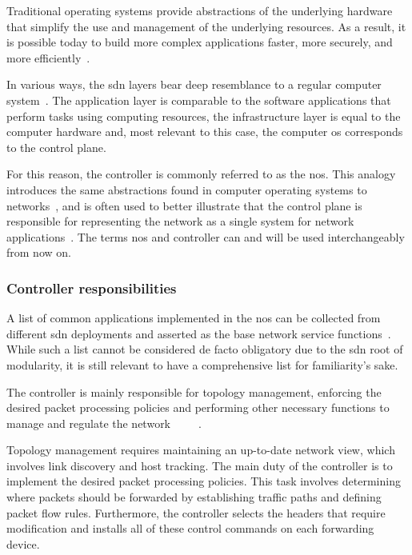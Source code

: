 Traditional operating systems provide abstractions of the underlying hardware that simplify the use and management of the underlying resources. As a result, it is possible today to build more complex applications faster, more securely, and more efficiently~\cite{kreutz_software-defined_2015}. 

In various ways, the \gls{sdn} layers bear deep resemblance to a regular computer system~\cite{thyagaturu_software_2016}. The application layer is comparable to the software applications that perform tasks using computing resources, the infrastructure layer is equal to the computer hardware and, most relevant to this case, the computer \gls{os} corresponds to the control plane. 

For this reason, the controller is commonly referred to as the \gls{nos}. This analogy introduces the same abstractions found in computer operating systems to networks~\cite{kreutz_software-defined_2015}, and is often used to better illustrate that the control plane is responsible for representing the network as a single system for network applications~\cite{nunes_survey_2014}. The terms \gls{nos} and controller can and will be used interchangeably from now on.

\subsubsection{Controller responsibilities}
A list of common applications implemented in the \gls{nos} can be collected from different \gls{sdn} deployments and asserted as the base network service functions~\cite{kreutz_software-defined_2015}. While such a list cannot be considered de facto obligatory due to the \gls{sdn} root of modularity, it is still relevant to have a comprehensive list for familiarity's sake.

The controller is mainly responsible for topology management, enforcing the desired packet processing policies and performing other necessary functions to manage and regulate the network~\cite{peterson_software-defined_2021}~\cite{latif_comprehensive_2020}~\cite{bifulco_survey_2018}~\cite{kreutz_software-defined_2015}~\cite{zhu_sdn_2020}. 

Topology management requires maintaining an up-to-date network view, which involves link discovery and host tracking.
The main duty of the controller is to implement the desired packet processing policies. This task involves determining where packets should be forwarded by establishing traffic paths and defining packet flow rules. Furthermore, the controller selects the headers that require modification and installs all of these control commands on each forwarding device.

